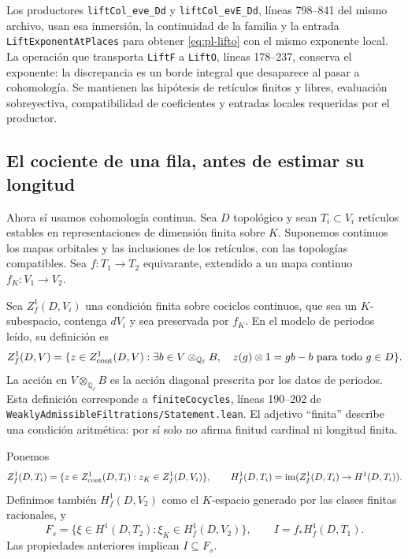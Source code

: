 Los productores \texttt{liftCol\_eve\_Dd} y
\texttt{liftCol\_evE\_Dd}, líneas 798--841 del mismo archivo,
usan esa inmersión, la continuidad de la familia y la entrada
\texttt{LiftExponentAtPlaces} para obtener \eqref{eq:pl-lifto}
con el mismo exponente local. La operación que transporta
\texttt{LiftF} a \texttt{LiftO}, líneas 178--237, conserva el
exponente: la discrepancia es un borde integral que desaparece al
pasar a cohomología. Se mantienen las hipótesis de retículos
finitos y libres, evaluación sobreyectiva, compatibilidad de
coeficientes y entradas locales requeridas por el productor.

\subsection{El cociente de una fila, antes de estimar su longitud}
\label{subsec:pl-cociente-fila}

Ahora sí usamos cohomología continua. Sea $D$ topológico y sean
$T_i\subset V_i$ retículos estables en representaciones de
dimensión finita sobre $K$. Suponemos continuos los mapas
orbitales y las inclusiones de los retículos, con las topologías
compatibles. Sea $f:T_1\to T_2$ equivarante, extendido a un mapa
continuo $f_K:V_1\to V_2$.

Sea $Z_f^1(D,V_i)$ una condición finita sobre cociclos continuos,
que sea un $K$-subespacio, contenga $dV_i$ y sea preservada por
$f_K$. En el modelo de periodos leído, su definición es
\begin{equation}
 Z_f^1(D,V)=\{z\in Z^1_{\rm cont}(D,V):
   \exists b\in V\otimes_{\mathbb Q_\ell}B,\quad
   z(g)\otimes1=gb-b\text{ para todo }g\in D\}.
 \label{eq:pl-zf}
\end{equation}
La acción en $V\otimes_{\mathbb Q_\ell}B$ es la acción diagonal prescrita por
los datos de periodos. Esta definición corresponde a
\texttt{finiteCocycles}, líneas 190--202 de
\texttt{WeaklyAdmissibleFiltrations/}\allowbreak\texttt{Statement.lean}.
El adjetivo ``finita'' describe una condición aritmética: por sí
solo no afirma finitud cardinal ni longitud finita.

Ponemos
\[
 Z_f^1(D,T_i)=\{z\in Z^1_{\rm cont}(D,T_i):z_K\in Z_f^1(D,V_i)\},
 \qquad H_f^1(D,T_i)=\operatorname{im}(Z_f^1(D,T_i)\to H^1(D,T_i)).
\]
Definimos también $H_f^1(D,V_2)$ como el $K$-espacio generado por
las clases finitas racionales, y
\begin{equation}
 F_s=\{\xi\in H^1(D,T_2):\xi_K\in H_f^1(D,V_2)\},\qquad
 I=f_*H_f^1(D,T_1).
 \label{eq:pl-fs}
\end{equation}
Las propiedades anteriores implican $I\subseteq F_s$.

